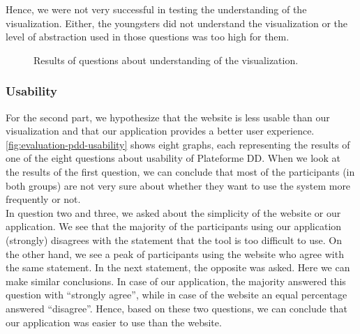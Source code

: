 Hence, we were not very successful in testing the understanding of the visualization. Either, the youngsters did not understand the visualization or the level of abstraction used in those questions was too high for them.

\begin{figure}[H]
	\centering
	\caption{Results of questions about understanding of the visualization.}
	\label{fig:evaluation-pdd-insight}
\end{figure}




%	
%	

\subsubsection{Usability}
For the second part, we hypothesize that the website is less usable than our visualization and that our application provides a better user experience.\\

\autoref{fig:evaluation-pdd-usability} shows eight graphs, each representing the results of one of the eight questions about usability of Plateforme DD. When we look at the results of the first question, we can conclude that most of the participants (in both groups) are not very sure about whether they want to use the system more frequently or not.\\

In question two and three, we asked about the simplicity of the website or our application. We see that the majority of the participants using our application (strongly) disagrees with the statement that the tool is too difficult to use. On the other hand, we see a peak of participants using the website who agree with the same statement. In the next statement, the opposite was asked. Here we can make similar conclusions. In case of our application, the majority answered this question with ``strongly agree'', while in case of the website an equal percentage answered ``disagree''. Hence, based on these two questions, we can conclude that our application was easier to use than the website.\\

